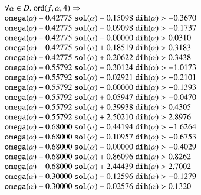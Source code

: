 $$
\begin{array}{lll}
\leftalign\\
\forall\alpha\in D. \ \op{ord}(f,\alpha,4) \Rightarrow \\
   \optt{omega}(\alpha) - 0.42775\ \optt{sol}(\alpha) - 0.15098\ \optt{dih}(\alpha) > -0.3670\\
   \optt{omega}(\alpha) - 0.42775\ \optt{sol}(\alpha) - 0.09098\ \optt{dih}(\alpha) > -0.1737\\
   \optt{omega}(\alpha) - 0.42775\ \optt{sol}(\alpha) - 0.00000\ \optt{dih}(\alpha) > 0.0310\\
   \optt{omega}(\alpha) - 0.42775\ \optt{sol}(\alpha) + 0.18519\ \optt{dih}(\alpha) > 0.3183\\
   \optt{omega}(\alpha) - 0.42775\ \optt{sol}(\alpha) + 0.20622\ \optt{dih}(\alpha) > 0.3438\\
   \optt{omega}(\alpha) - 0.55792\ \optt{sol}(\alpha) - 0.30124\ \optt{dih}(\alpha) > -1.0173\\
   \optt{omega}(\alpha) - 0.55792\ \optt{sol}(\alpha) - 0.02921\ \optt{dih}(\alpha) > -0.2101\\
   \optt{omega}(\alpha) - 0.55792\ \optt{sol}(\alpha) - 0.00000\ \optt{dih}(\alpha) > -0.1393\\
   \optt{omega}(\alpha) - 0.55792\ \optt{sol}(\alpha) + 0.05947\ \optt{dih}(\alpha) > -0.0470\\
   \optt{omega}(\alpha) - 0.55792\ \optt{sol}(\alpha) + 0.39938\ \optt{dih}(\alpha) > 0.4305\\
   \optt{omega}(\alpha) - 0.55792\ \optt{sol}(\alpha) + 2.50210\ \optt{dih}(\alpha) > 2.8976\\
   \optt{omega}(\alpha) - 0.68000\ \optt{sol}(\alpha) - 0.44194\ \optt{dih}(\alpha) > -1.6264\\
   \optt{omega}(\alpha) - 0.68000\ \optt{sol}(\alpha) - 0.10957\ \optt{dih}(\alpha) > -0.6753\\
   \optt{omega}(\alpha) - 0.68000\ \optt{sol}(\alpha) - 0.00000\ \optt{dih}(\alpha) > -0.4029\\
   \optt{omega}(\alpha) - 0.68000\ \optt{sol}(\alpha) + 0.86096\ \optt{dih}(\alpha) > 0.8262\\
   \optt{omega}(\alpha) - 0.68000\ \optt{sol}(\alpha) + 2.44439\ \optt{dih}(\alpha) > 2.7002\\
   \optt{omega}(\alpha) - 0.30000\ \optt{sol}(\alpha) - 0.12596\ \optt{dih}(\alpha) > -0.1279\\
   \optt{omega}(\alpha) - 0.30000\ \optt{sol}(\alpha) - 0.02576\ \optt{dih}(\alpha) > 0.1320\\

\end{array}$$

